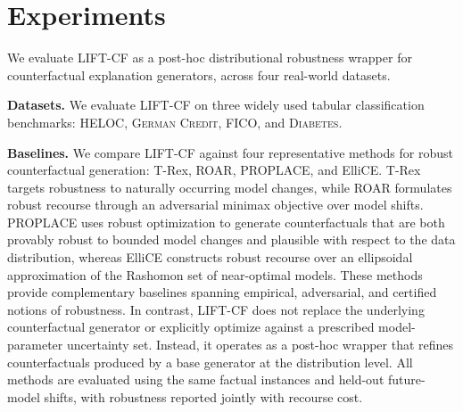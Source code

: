 \section{Experiments}\label{sec:experiments}

We evaluate \textsc{LIFT-CF} as a post-hoc distributional
robustness wrapper for counterfactual explanation generators, across four real-world datasets.

\textbf{Datasets.}
We evaluate LIFT-CF on three widely used tabular classification benchmarks: \textsc{HELOC}, \textsc{German Credit}, \textsc{FICO}, and \textsc{Diabetes}. 


\textbf{Baselines.}
We compare LIFT-CF against four representative methods for robust counterfactual generation: T-Rex, ROAR, PROPLACE, and ElliCE. T-Rex targets robustness to naturally occurring model changes, while ROAR formulates robust recourse through an adversarial minimax objective over model shifts. PROPLACE uses robust optimization to generate counterfactuals that are both provably robust to bounded model changes and plausible with respect to the data distribution, whereas ElliCE constructs robust recourse over an ellipsoidal approximation of the Rashomon set of near-optimal models. These methods provide complementary baselines spanning empirical, adversarial, and certified notions of robustness. In contrast, LIFT-CF does not replace the underlying counterfactual generator or explicitly optimize against a prescribed model-parameter uncertainty set. Instead, it operates as a post-hoc wrapper that refines counterfactuals produced by a base generator at the distribution level. All methods are evaluated using the same factual instances and held-out future-model shifts, with robustness reported jointly with recourse cost.


